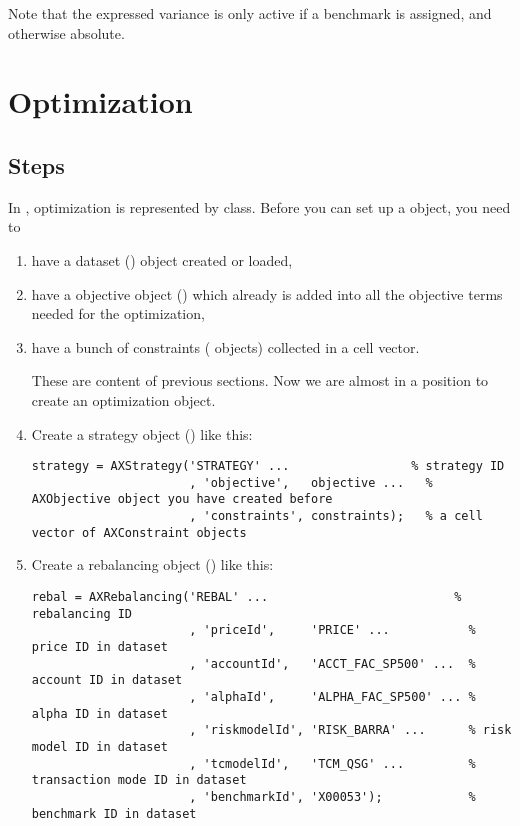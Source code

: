   Note that the expressed variance is only active if a benchmark is assigned, and otherwise absolute. 


\section{Optimization}

\subsection{Steps}

In \matlab{}, optimization is represented by  class.
Before you can set up a  object,
you need to

\begin{enumerate}
    \item have a dataset () object created or loaded,
    \item have a objective object () which already is added into all the objective terms needed for the optimization,
    \item have a bunch of constraints ( objects) collected in a cell vector.

These are content of previous sections.
Now we are almost in a position to create an optimization object.

    \item Create a strategy object () like this:
          \begin{lstlisting}[numbers=none]
  strategy = AXStrategy('STRATEGY' ...                 % strategy ID
                      , 'objective',   objective ...   % AXObjective object you have created before
                      , 'constraints', constraints);   % a cell vector of AXConstraint objects
          \end{lstlisting}

    \item Create a rebalancing object () like this:
          \begin{lstlisting}[numbers=none]
  rebal = AXRebalancing('REBAL' ...                          % rebalancing ID
                      , 'priceId',     'PRICE' ...           % price ID in dataset
                      , 'accountId',   'ACCT_FAC_SP500' ...  % account ID in dataset
                      , 'alphaId',     'ALPHA_FAC_SP500' ... % alpha ID in dataset
                      , 'riskmodelId', 'RISK_BARRA' ...      % risk model ID in dataset
                      , 'tcmodelId',   'TCM_QSG' ...         % transaction mode ID in dataset
                      , 'benchmarkId', 'X00053');            % benchmark ID in dataset
          \end{lstlisting}


\end{enumerate}
